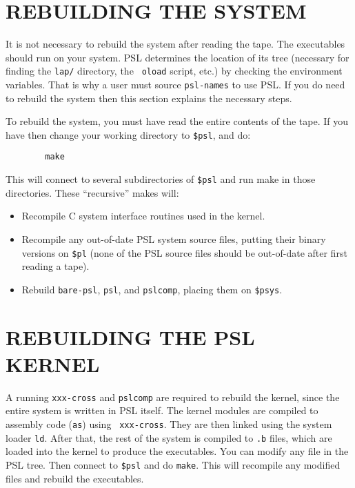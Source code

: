 \section{REBUILDING THE SYSTEM}

It is not necessary to rebuild the system after reading the tape.  The
executables should run on your system.  PSL determines the location of
its tree (necessary for finding the {\tt lap/} directory, the {\tt
oload} script, etc.) by checking the environment variables.  That is
why a user must source {\tt psl-names} to use PSL.  If you do need to
rebuild the system then this section explains the necessary steps.

To rebuild the system, you must have read the entire contents of the
tape.  If you have then change your
working directory to {\tt \$psl}, and do:
\begin{verbatim}
        make
\end{verbatim}

This will connect to several subdirectories of {\tt \$psl} and run
make in those directories.  These ``recursive'' makes will:

\begin{itemize}

\item Recompile C system interface routines used in the kernel.

\item Recompile any out-of-date PSL system source files, putting their
binary versions on {\tt \$pl} (none of the PSL source files should be
out-of-date after first reading a tape).

\item Rebuild {\tt bare-psl}, {\tt psl}, and {\tt pslcomp}, placing
them on {\tt \$psys}.

\end{itemize}

\section{REBUILDING THE PSL KERNEL}

A running {\tt xxx-cross} and {\tt pslcomp} are required to rebuild
the kernel, since the entire system is written in PSL itself.  The
kernel modules are compiled to assembly code ({\tt as}) using {\tt
xxx-cross}.  They are then linked using the system loader {\tt ld}.
After that, the rest of the system is compiled to {\tt .b} files,
which are loaded into the kernel to produce the executables.  You can
modify any file in the PSL tree.  Then connect to {\tt \$psl} and do
{\tt make}.  This will recompile any modified files and rebuild the
executables.

